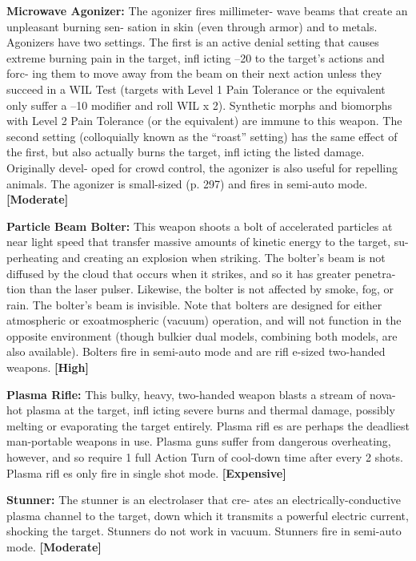 \textbf{Microwave Agonizer: }The agonizer fires millimeter-
wave beams that create an unpleasant burning sen-
sation in skin (even through armor) and to metals. 
Agonizers have two settings. The first is an active 
denial setting that causes extreme burning pain in the 
target, infl icting –20 to the target's actions and forc-
ing them to move away from the beam on their next 
action unless they succeed in a WIL Test (targets with 
Level 1 Pain Tolerance or the equivalent only suffer 
a –10 modifier and roll WIL x 2). Synthetic morphs 
and biomorphs with Level 2 Pain Tolerance (or the 
equivalent) are immune to this weapon. The second 
setting (colloquially known as the ``roast'' setting) has 
the same effect of the first, but also actually burns the 
target, infl icting the listed damage. Originally devel-
oped for crowd control, the agonizer is also useful for 
repelling animals. The agonizer is small-sized (p. 297) 
and fires in semi-auto mode. \textbf{[Moderate]}

\textbf{Particle Beam Bolter:} This weapon shoots a bolt of 
accelerated particles at near light speed that transfer 
massive amounts of kinetic energy to the target, su-
perheating and creating an explosion when striking. 
The bolter's beam is not diffused by the cloud that 
occurs when it strikes, and so it has greater penetra-
tion than the laser pulser. Likewise, the bolter is not 
affected by smoke, fog, or rain. The bolter's beam is 
invisible. Note that bolters are designed for either 
atmospheric or exoatmospheric (vacuum) operation, 
and will not function in the opposite environment 
(though bulkier dual models, combining both models, 
are also available). Bolters fire in semi-auto mode and 
are rifl e-sized two-handed weapons. \textbf{[High]}

\textbf{Plasma Rifle:} This bulky, heavy, two-handed 
weapon blasts a stream of nova-hot plasma at the 
target, infl icting severe burns and thermal damage, 
possibly melting or evaporating the target entirely. 
Plasma rifl es are perhaps the deadliest man-portable 
weapons in use. Plasma guns suffer from dangerous 
overheating, however, and so require 1 full Action 
Turn of cool-down time after every 2 shots. Plasma 
rifl es only fire in single shot mode. \textbf{[Expensive]}

\textbf{Stunner:} The stunner is an electrolaser that cre-
ates an electrically-conductive plasma channel to the 
target, down which it transmits a powerful electric 
current, shocking the target. Stunners do not work in 
vacuum. Stunners fire in semi-auto mode. \textbf{[Moderate]}

